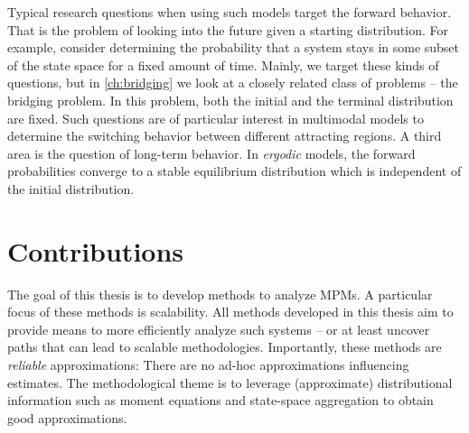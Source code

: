 Typical research questions when using such models target the forward behavior.
That is the problem of looking into the future given a starting distribution.
For example, consider determining the probability that a system stays
in some subset of the state space for a fixed amount of time.
Mainly, we target these kinds of questions, but in
\autoref{ch:bridging} we look at a closely related class of problems
-- the bridging problem.
In this problem, both the initial and the terminal distribution are fixed.
Such questions are of particular interest in multimodal models to
determine the switching behavior between different attracting regions.
A third area is the question of long-term behavior.
In \emph{ergodic} models, the forward probabilities converge to a
stable equilibrium distribution which is independent of the initial
distribution.

\section{Contributions}
The goal of this thesis is to develop methods to analyze \acp{MPM}.
A particular focus of these methods is scalability.
All methods developed in this thesis aim to provide means to more
efficiently analyze such systems -- or at least uncover paths that
can lead to scalable methodologies.
Importantly, these methods are \emph{reliable} approximations: There
are no ad-hoc approximations influencing estimates.
The methodological theme is to leverage (approximate) distributional
information such as moment equations and state-space aggregation to
obtain good approximations.

